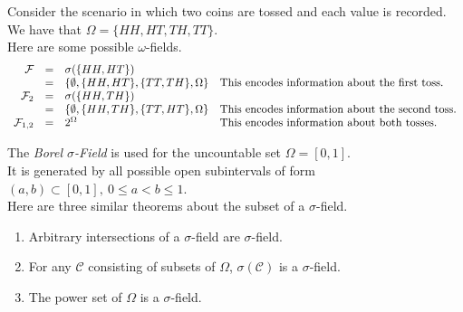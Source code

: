 \documentclass[11pt,a4paper]{article}
\begin{document}
Consider the scenario in which two coins are tossed and each value is recorded.\\
We have that $\Omega=\{HH,HT,TH,TT\}$.\\
Here are some possible $\omega$-fields.\\
\[\begin{array}{rcll}
\sigmafield&=&\sigma(\{HH,HT\})\\
&=&\left\{\emptyset,\{HH,HT\},\{TT,TH\},\Omega\right\}&\mathrm{This\ encodes\ information\ about\ the\ first\ toss.}\\
\sigmafield_2&=&\sigma(\{HH,TH\})\\
&=&\left\{\emptyset,\{HH,TH\},\{TT,HT\},\Omega\right\}&\mathrm{This\ encodes\ information\ about\ the\ second\ toss.}\\
\sigmafield_{1,2}&=&2^\Omega&\mathrm{This\ encodes\ information\ about\ both\ tosses.}
\end{array}\]

The \textit{Borel $\sigma$-Field} is used for the uncountable set $\Omega=[0,1]$.\\
It is generated by all possible open subintervals of form $(a,b)\subset[0,1],\ 0\leq a<b\leq1$.\\

Here are three similar theorems about the subset of a $\sigma$-field.
\begin{enumerate}[label=\roman*)]
	\item Arbitrary intersections of a $\sigma$-field are $\sigma$-field.
	\item For any $\mathcal{C}$ consisting of subsets of $\Omega$, $\sigma(\mathcal{C})$ is a $\sigma$-field.
	\item The power set of $\Omega$ is a $\sigma$-field.
\end{enumerate}
\end{document}
